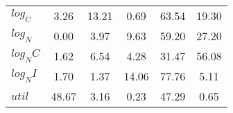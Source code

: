 \begin{center}
\begin{longtable}{lccccc}
$log_C         $	 & 	        3.26	 & 	       13.21	 & 	        0.69	 & 	       63.54	 & 	       19.30 \\ 
$log_N         $	 & 	        0.00	 & 	        3.97	 & 	        9.63	 & 	       59.20	 & 	       27.20 \\ 
$log_NC        $	 & 	        1.62	 & 	        6.54	 & 	        4.28	 & 	       31.47	 & 	       56.08 \\ 
$log_NI        $	 & 	        1.70	 & 	        1.37	 & 	       14.06	 & 	       77.76	 & 	        5.11 \\ 
$util          $	 & 	       48.67	 & 	        3.16	 & 	        0.23	 & 	       47.29	 & 	        0.65 \\ 
\end{longtable}
 \end{center}
